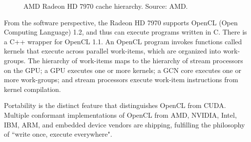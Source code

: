 \begin{figure}
\centering
\caption{AMD Radeon HD 7970 cache hierarchy. Source: AMD.}
\label{idock:RadeonHD7970CacheHierarchy}
\end{figure}

From the software perspective, the Radeon HD 7970 supports OpenCL (Open Computing Language) 1.2, and thus can execute programs written in C. There is a C++ wrapper for OpenCL 1.1. An OpenCL program invokes functions called kernels that execute across parallel work-items, which are organized into work-groups. The hierarchy of work-items maps to the hierarchy of stream processors on the GPU; a GPU executes one or more kernels; a GCN core executes one or more work-groups; and stream processors execute work-item instructions from kernel compilation.

Portability is the distinct feature that distinguishes OpenCL from CUDA. Multiple conformant implementations of OpenCL from AMD, NVIDIA, Intel, IBM, ARM, and embedded device vendors are shipping, fulfilling the philosophy of ``write once, execute everywhere".

\chapterend
